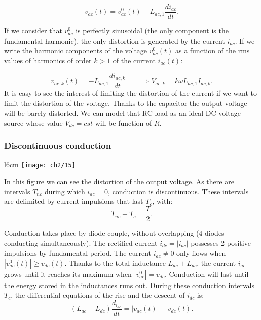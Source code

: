 		\begin{equation}
			v_{ac}(t) = v_{ac}^0(t) - L_{ac,1}\frac{di_{ac}}{dt}.
		\end{equation}
		
		If we consider that $v_{ac}^0$ is perfectly sinusoidal (the only component is the fundamental harmonic), the only distortion is generated by the current $i_{ac}$. If we write the harmonic components of the voltage $v_{ac}^0(t)$ as a function of the rms values of harmonics of order $k>1$ of the current $i_{ac}(t)$:
		
		\begin{equation}
			v_{ac,k}(t) = -L_{ac,1}\frac{di_{ac,k}}{dt} \qquad \Rightarrow  V_{ac,k} = k\omega L_{ac,1} I_{ac,k}.
		\end{equation}
	    It is easy to see the interest of limiting the distortion of the current if we want to limit the distortion of the voltage. Thanks to the capacitor the output voltage will be barely distorted. We can model that RC load as an ideal DC voltage source whose value $V_{dc}=cst$ will be function of $R$. 
		
		\subsubsection{Discontinuous conduction}
			\begin{wrapfigure}[9]{l}{6cm}
			\vspace{-5mm}
			\texttt{[image: ch2/15]}
			\end{wrapfigure} 
			In this figure we can see the distortion of the output voltage. As there are intervals $T_{nc}$ during which $i_{ac} = 0$, conduction is discontinuous. These intervals are delimited by current impulsions that last $T_{c}$, with:
			\begin{equation}
				T_{nc} + T_c = \frac{T}{2}.
			\end{equation}
			
		    Conduction takes place by diode couple, without overlapping (4 diodes conducting simultaneously). The rectified current $i_{dc} = |i_{ac}|$ possesses 2 positive impulsions by fundamental period. The current $i_{ac} \neq 0$ only flows when $|v_{ac}^0(t)| \geq v_{dc}(t)$. Thanks to the total inductance $L_{ac} + L_{dc}$, the current $i_{ac}$ grows until it reaches its maximum when $|v_{ac}^0| = v_{dc}$. Conduction will last until the energy stored in the inductances runs out. During these conduction intervals $T_c$, the differential equations of the rise and the descent of $i_{dc}$ is:
			\begin{equation}
				(L_{ac}+L_{dc})\frac{d_{i_{dc}}}{dt} = |v_{ac}(t)|-v_{dc}(t).
			\end{equation}
			
